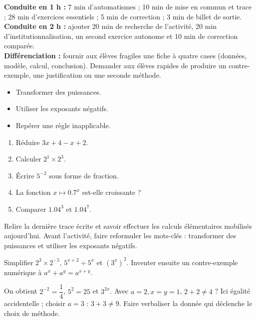 \ifmxteacher
\begin{method}
\textbf{Conduite en 1 h :} 7 min d'automatismes ; 10 min de mise en commun et trace ; 28 min d'exercices essentiels ; 5 min de correction ; 3 min de billet de sortie.\\
\textbf{Conduite en 2 h :} ajouter 20 min de recherche de l'activité, 20 min d'institutionnalisation, un second exercice autonome et 10 min de correction comparée.\\
\textbf{Différenciation :} fournir aux élèves fragiles une fiche à quatre cases (données, modèle, calcul, conclusion). Demander aux élèves rapides de produire un contre-exemple, une justification ou une seconde méthode.
\end{method}
\fi
{}
\begin{objectives}\begin{itemize}\item Transformer des puissances.\item Utiliser les exposants négatifs.\item Repérer une règle inapplicable.\end{itemize}\end{objectives}
\begin{fluency}\begin{enumerate}\item Réduire $3x+4-x+2$. \item Calculer $2^1\times2^3$. \item Écrire $5^{-2}$ sous forme de fraction. \item La fonction $x\mapsto\num{0,7}^x$ est-elle croissante ? \item Comparer $\num{1,04}^3$ et $\num{1,04}^7$. \end{enumerate}\end{fluency}
\begin{prerequisites}Relire la dernière trace écrite et savoir effectuer les calculs élémentaires mobilisés aujourd'hui. Avant l'activité, faire reformuler les mots-clés : transformer des puissances et utiliser les exposants négatifs.\end{prerequisites}

\begin{activity}
Simplifier $2^3\times2^{-5}$, $5^{x+2}\div5^x$ et $(3^x)^2$. Inventer ensuite un contre-exemple numérique à $a^x+a^y=a^{x+y}$.

\end{activity}
\begin{solution}On obtient $2^{-2}=\dfrac14$, $5^2=25$ et $3^{2x}$. Avec $a=2,x=y=1$, $2+2\neq4$ ? Ici égalité accidentelle ; choisir $a=3$ : $3+3\neq9$. Faire verbaliser la donnée qui déclenche le choix de méthode.\end{solution}


